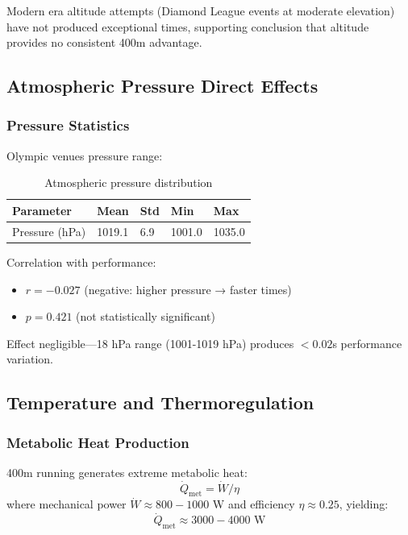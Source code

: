 Modern era altitude attempts (Diamond League events at moderate elevation) have not produced exceptional times, supporting conclusion that altitude provides no consistent 400m advantage.

\subsection{Atmospheric Pressure Direct Effects}

\subsubsection{Pressure Statistics}

Olympic venues pressure range:

\begin{table}[H]
\centering
\caption{Atmospheric pressure distribution}
\begin{tabular}{@{}lllll@{}}
\toprule
\textbf{Parameter} & \textbf{Mean} & \textbf{Std} & \textbf{Min} & \textbf{Max} \\
\midrule
Pressure (hPa) & 1019.1 & 6.9 & 1001.0 & 1035.0 \\
\bottomrule
\end{tabular}
\end{table}

Correlation with performance:
\begin{itemize}
    \item $r = -0.027$ (negative: higher pressure → faster times)
    \item $p = 0.421$ (not statistically significant)
\end{itemize}

Effect negligible—18 hPa range (1001-1019 hPa) produces $<0.02$s performance variation.

\subsection{Temperature and Thermoregulation}

\subsubsection{Metabolic Heat Production}

400m running generates extreme metabolic heat:
\begin{equation}
\dot{Q}_{\text{met}} = \dot{W} / \eta
\end{equation}
where mechanical power $\dot{W} \approx 800-1000$ W and efficiency $\eta \approx 0.25$, yielding:
\begin{equation}
\dot{Q}_{\text{met}} \approx 3000-4000 \text{ W}
\end{equation}

